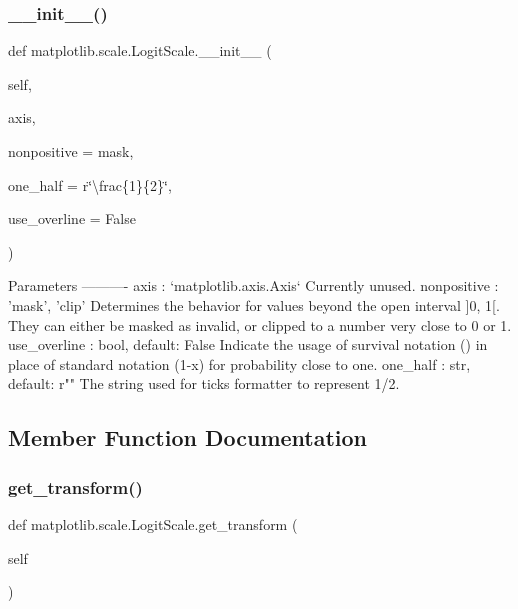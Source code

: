 \subsubsection{\texorpdfstring{\+\_\+\+\_\+init\+\_\+\+\_\+()}{\_\_init\_\_()}}
{\footnotesize\ttfamily def matplotlib.\+scale.\+Logit\+Scale.\+\_\+\+\_\+init\+\_\+\+\_\+ (\begin{DoxyParamCaption}\item[{}]{self,  }\item[{}]{axis,  }\item[{}]{nonpositive = {\ttfamily \textquotesingle{}mask\textquotesingle{}},  }\item[{}]{one\+\_\+half = {\ttfamily r\char`\"{}\textbackslash{}frac\{1\}\{2\}\char`\"{}},  }\item[{}]{use\+\_\+overline = {\ttfamily False} }\end{DoxyParamCaption})}

\begin{DoxyVerb}Parameters
----------
axis : `matplotlib.axis.Axis`
    Currently unused.
nonpositive : {'mask', 'clip'}
    Determines the behavior for values beyond the open interval ]0, 1[.
    They can either be masked as invalid, or clipped to a number very
    close to 0 or 1.
use_overline : bool, default: False
    Indicate the usage of survival notation () in place of
    standard notation (1-x) for probability close to one.
one_half : str, default: r""
    The string used for ticks formatter to represent 1/2.
\end{DoxyVerb}
 

\subsection{Member Function Documentation}
\mbox{\label{classmatplotlib_1_1scale_1_1LogitScale_adeb19e0a28722c2323c193183eee433c}} 
\subsubsection{\texorpdfstring{get\+\_\+transform()}{get\_transform()}}
{\footnotesize\ttfamily def matplotlib.\+scale.\+Logit\+Scale.\+get\+\_\+transform (\begin{DoxyParamCaption}\item[{}]{self }\end{DoxyParamCaption})}

